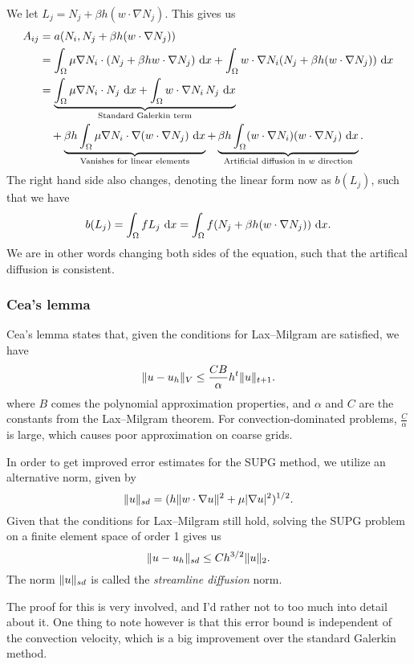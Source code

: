 We let $L_j = N_j + \beta h (w \cdot \nabla N_j)$.
This gives us
\begin{align*}
    A_{ij} &= a(N_i, N_j + \beta h (w \cdot \nabla N_j)) \\
    &= \int_{\Omega} \mu \nabla N_i \cdot (N_j + \beta h w \cdot \nabla N_j) \, \mathop{}\!\mathrm{d} x + \int_{\Omega} w \cdot \nabla N_i (N_j + \beta h (w \cdot \nabla N_j)) \, \mathop{}\!\mathrm{d} x \\
    &= \underbrace{
        \int_{\Omega} \mu \nabla N_i \cdot N_j \, \mathop{}\!\mathrm{d} x
        + \int_{\Omega} w \cdot \nabla N_i \, N_j \, \mathop{}\!\mathrm{d} x
    }_{\text{Standard Galerkin term}} \\
    &\quad + \underbrace{
        \beta h
        \int_{\Omega} \mu \nabla N_i \cdot \nabla (w \cdot \nabla N_j) \, \mathop{}\!\mathrm{d} x
    }_{\text{Vanishes for linear elements}}
    + \underbrace{
        \beta h
        \int_{\Omega} (w \cdot \nabla N_i) (w \cdot \nabla N_j) \, \mathop{}\!\mathrm{d} x
    }_{\text{Artificial diffusion in $w$ direction}}.
\end{align*}
The right hand side also changes, denoting the linear form now as $b(L_j)$, such that we have
\begin{equation}
    b(L_j)
    = \int_{\Omega} f L_j \, \mathop{}\!\mathrm{d} x
    = \int_{\Omega} f (N_j + \beta h (w \cdot \nabla N_j)) \, \mathop{}\!\mathrm{d} x.
\end{equation}
We are in other words changing both sides of the equation, such that the artifical diffusion is consistent.

\subsubsection{Cea's lemma}
Cea's lemma states that, given the conditions for Lax--Milgram are satisfied, we have %
\begin{equation}
    \lVert u - u_h\rVert_{V} \leq \frac{C B}{\alpha} h^t \lVert u\rVert_{t + 1}.
\end{equation}
where $B$ comes the polynomial approximation properties, and $\alpha$ and $C$ are the constants from the Lax--Milgram theorem. %
For convection-dominated problems, $\frac{C}{\alpha}$ is large, which causes poor approximation on coarse grids.

In order to get improved error estimates for the SUPG method, we utilize an alternative norm, given by
\begin{equation}
    \lVert u\rVert_{sd} = (h \lVert w \cdot \nabla u\rVert^2 + \mu \lvert\nabla u\rvert^2)^{1/2}.
\end{equation}
Given that the conditions for Lax--Milgram still hold, solving the SUPG problem on a finite element space of order 1 gives us %
\begin{equation}
    \lVert u - u_h\rVert_{sd} \leq C h^{3/2} \lVert u\rVert_2.
\end{equation}
The norm $\lVert u\rVert_{sd}$ is called the \textit{streamline diffusion} norm.

The proof for this is very involved, and I'd rather not to too much into detail about it.
One thing to note however is that this error bound is independent of the convection velocity, which is a big improvement over the standard Galerkin method.